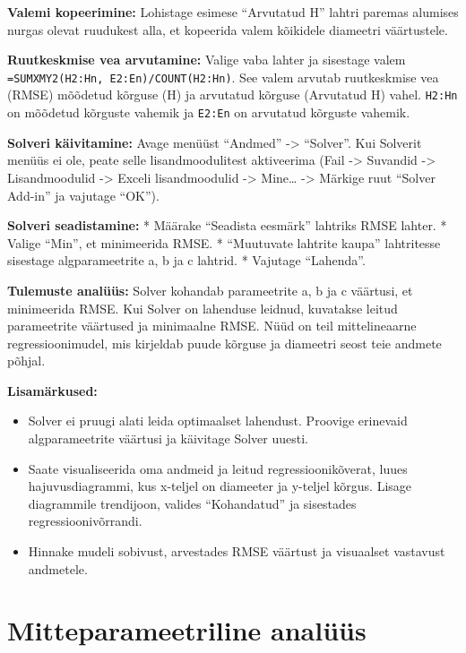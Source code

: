 \documentclass[
]{book}
\providecommand{\tightlist}{%
  \setlength{\itemsep}{0pt}\setlength{\parskip}{0pt}}
\begin{document}
\textbf{Valemi kopeerimine:} Lohistage esimese ``Arvutatud H'' lahtri paremas alumises nurgas olevat ruudukest alla, et kopeerida valem kõikidele diameetri väärtustele.

\textbf{Ruutkeskmise vea arvutamine:} Valige vaba lahter ja sisestage valem \texttt{=SUMXMY2(H2:Hn,\ E2:En)/COUNT(H2:Hn)}. See valem arvutab ruutkeskmise vea (RMSE) mõõdetud kõrguse (H) ja arvutatud kõrguse (Arvutatud H) vahel. \texttt{H2:Hn} on mõõdetud kõrguste vahemik ja \texttt{E2:En} on arvutatud kõrguste vahemik.

\textbf{Solveri käivitamine:} Avage menüüst ``Andmed'' -\textgreater{} ``Solver''. Kui Solverit menüüs ei ole, peate selle lisandmoodulitest aktiveerima (Fail -\textgreater{} Suvandid -\textgreater{} Lisandmoodulid -\textgreater{} Exceli lisandmoodulid -\textgreater{} Mine\ldots{} -\textgreater{} Märkige ruut ``Solver Add-in'' ja vajutage ``OK'').

\textbf{Solveri seadistamine:}
* Määrake ``Seadista eesmärk'' lahtriks RMSE lahter.
* Valige ``Min'', et minimeerida RMSE.
* ``Muutuvate lahtrite kaupa'' lahtritesse sisestage algparameetrite a, b ja c lahtrid.
* Vajutage ``Lahenda''.

\textbf{Tulemuste analüüs:} Solver kohandab parameetrite a, b ja c väärtusi, et minimeerida RMSE. Kui Solver on lahenduse leidnud, kuvatakse leitud parameetrite väärtused ja minimaalne RMSE. Nüüd on teil mittelineaarne regressioonimudel, mis kirjeldab puude kõrguse ja diameetri seost teie andmete põhjal.

\textbf{Lisamärkused:}

\begin{itemize}
\tightlist
\item
  Solver ei pruugi alati leida optimaalset lahendust. Proovige erinevaid algparameetrite väärtusi ja käivitage Solver uuesti.
\item
  Saate visualiseerida oma andmeid ja leitud regressioonikõverat, luues hajuvusdiagrammi, kus x-teljel on diameeter ja y-teljel kõrgus. Lisage diagrammile trendijoon, valides ``Kohandatud'' ja sisestades regressioonivõrrandi.
\item
  Hinnake mudeli sobivust, arvestades RMSE väärtust ja visuaalset vastavust andmetele.
\end{itemize}

\chapter{Mitteparameetriline analüüs}\label{mitteparameetriline-analuxfcuxfcs}
\end{document}
